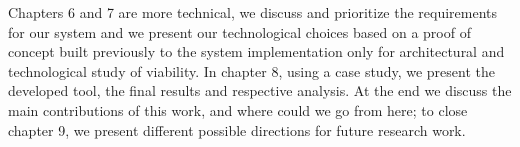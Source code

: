 \indent Chapters 6 and 7 are more technical, we discuss and prioritize the requirements for our system and we present our technological choices based on a proof of concept built previously to the system implementation only for architectural and technological study of viability. In chapter 8, using a case study, we present the developed tool, the final results and respective analysis. At the end we discuss the main contributions of this work, and where could we go from here; to close chapter 9, we present different possible directions for future research work.
